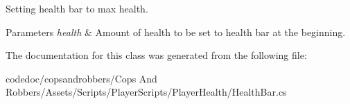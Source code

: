Setting health bar to max health. 


\begin{DoxyParams}{Parameters}
{\em health} & Amount of health to be set to health bar at the beginning.\\
\hline
\end{DoxyParams}


The documentation for this class was generated from the following file\+:\begin{DoxyCompactItemize}
\item 
codedoc/copsandrobbers/\+Cops And Robbers/\+Assets/\+Scripts/\+Player\+Scripts/\+Player\+Health/Health\+Bar.\+cs\end{DoxyCompactItemize}
